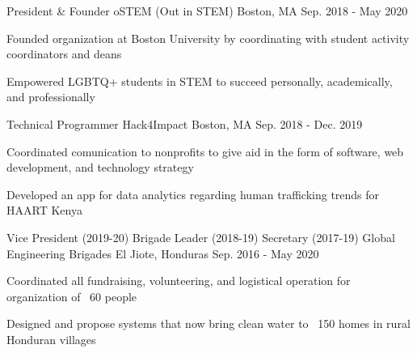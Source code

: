 


\begin{cventries}


\cventry
{President \& Founder} %
{oSTEM (Out in STEM)} %
{Boston, MA} %
{Sep. 2018 - May 2020} %
{ %
\begin{cvitems}
\item {Founded organization at Boston University by coordinating with student activity coordinators and deans}
\item {Empowered LGBTQ+ students in STEM to succeed personally, academically, and professionally}
\end{cvitems}
}


\cventry
{Technical Programmer} %
{Hack4Impact} %
{Boston, MA} %
{Sep. 2018 - Dec. 2019} %
{ %
\begin{cvitems}
\item {Coordinated comunication to nonprofits to give aid in the form of software, web development, and technology strategy}
\item {Developed an app for data analytics regarding human trafficking trends for HAART Kenya}
\end{cvitems}
}


\cventry
{Vice President (2019-20) {\bullet} Brigade Leader (2018-19) {\bullet} Secretary (2017-19)} %
{Global Engineering Brigades} %
{El Jiote, Honduras} %
{Sep. 2016 - May 2020} %
{ %
\begin{cvitems}
\item {Coordinated all fundraising, volunteering, and logistical operation for organization of ~60 people}
\item {Designed and propose systems that now bring clean water to ~150 homes in rural Honduran villages}
\end{cvitems}
}


\end{cventries}
